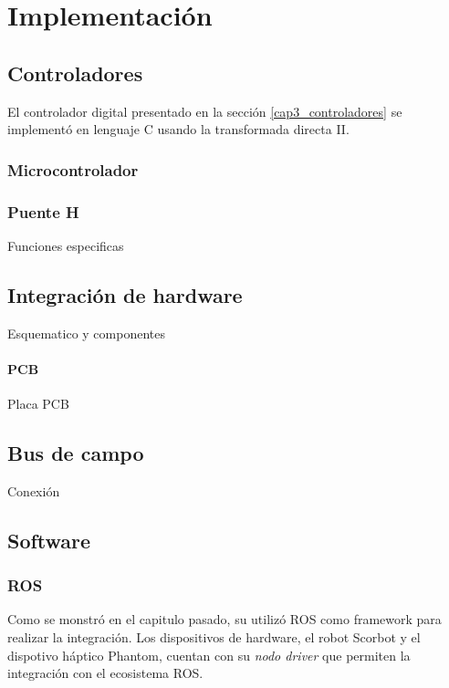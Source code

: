 \chapter{Implementación}


\section{Controladores}

El controlador digital presentado en la sección \ref{cap3_controladores} se implementó en lenguaje C usando la transformada directa II.



\subsection{Microcontrolador}



\subsection{Puente H}

Funciones especificas

\section{Integración de hardware}

Esquematico y componentes

\subsubsection{PCB}

Placa PCB

\section{Bus de campo}

Conexión


\section{Software}

\subsection{ROS}

Como se monstró en el capitulo pasado, su utilizó ROS como framework para realizar la integración. Los dispositivos de hardware, el robot Scorbot y el dispotivo háptico Phantom, cuentan con su \textit{nodo driver} que permiten la integración con el ecosistema ROS.

